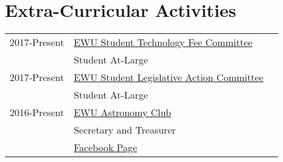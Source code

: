 \documentclass[]{deedy-resume-openfont}
\begin{document}
\begin{minipage}[t]{0.75\textwidth}
\section{Extra-Curricular Activities} 
\begin{tabular}{rll}
2017-Present & \underline{EWU Student Technology Fee Committee}\\
 & Student At-Large\\
2017-Present & \underline{EWU Student Legislative Action Committee}\\
 & Student At-Large\\
2016-Present & \underline{EWU Astronomy Club} \\
 & Secretary and Treasurer\\
 & \href{facebook.com/ewuspaceclub}{Facebook Page}

\end{tabular}
\sectionsep

\end{minipage} 
\end{document}
